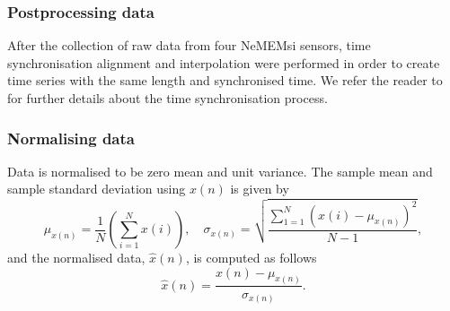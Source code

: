 \documentclass[fleqn,10pt]{wlscirep}
\begin{document}
\subsubsection*{Postprocessing data}
After the collection of raw data from four NeMEMsi sensors,
time synchronisation alignment and interpolation were performed 
in order to create time series with the same length and synchronised time.
We refer the reader to \cite{Comotti2014} for further
details about the time synchronisation process.

\subsubsection*{Normalising data}
Data is normalised to be zero mean and unit variance.
The sample mean and sample standard deviation using $x(n)$ is given by
\begin{equation}\label{eq:ms}
\mu_{x(n)}= \frac{1}{N} ( \sum_{i=1}^N x(i) ), \quad 
	\sigma_{x(n)} =  \sqrt{ \frac{  \sum_{1=1}^N ( x(i) - \mu_{x(n)} )^2 }{ N-1 }  },      
\end{equation}
and the normalised data, $\hat{x}(n)$, is computed as follows
\begin{equation}\label{eq:normalization}
\hat{x} (n) = \frac{   x(n) -  \mu_{x(n)}  }{   \sigma_{x(n)} }.   
\end{equation}
\end{document}
